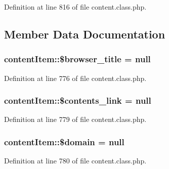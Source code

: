 Definition at line 816 of file content.\+class.\+php.



\subsection{Member Data Documentation}
\hypertarget{classcontentItem_abaf3b2f2d6878f8568161f4fce4e80bf}{}
\subsubsection[{\$browser\+\_\+title}]{\setlength{\rightskip}{0pt plus 5cm}content\+Item\+::\$browser\+\_\+title = null}\label{classcontentItem_abaf3b2f2d6878f8568161f4fce4e80bf}


Definition at line 776 of file content.\+class.\+php.

\hypertarget{classcontentItem_a6bf076b1d98025ee3f1d847fcf1fd29f}{}
\subsubsection[{\$contents\+\_\+link}]{\setlength{\rightskip}{0pt plus 5cm}content\+Item\+::\$contents\+\_\+link = null}\label{classcontentItem_a6bf076b1d98025ee3f1d847fcf1fd29f}


Definition at line 779 of file content.\+class.\+php.

\hypertarget{classcontentItem_a428d40bc2148eae5661822963ba819b4}{}
\subsubsection[{\$domain}]{\setlength{\rightskip}{0pt plus 5cm}content\+Item\+::\$domain = null}\label{classcontentItem_a428d40bc2148eae5661822963ba819b4}


Definition at line 780 of file content.\+class.\+php.

\hypertarget{classcontentItem_a3ed95afadefbe20bd085e1d88220f4b1}{}
